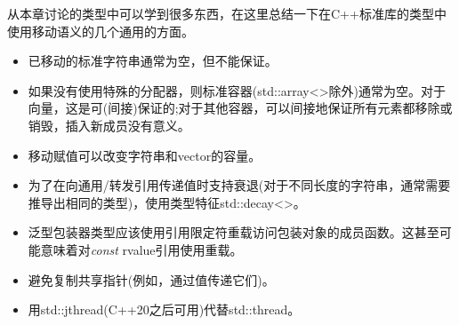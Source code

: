 从本章讨论的类型中可以学到很多东西，在这里总结一下在C++标准库的类型中使用移动语义的几个通用的方面。\par

\begin{itemize}
	\item 已移动的标准字符串通常为空，但不能保证。
	\item 如果没有使用特殊的分配器，则标准容器(std::array<>除外)通常为空。对于向量，这是可(间接)保证的;对于其他容器，可以间接地保证所有元素都移除或销毁，插入新成员没有意义。
	\item 移动赋值可以改变字符串和vector的容量。
	\item 为了在向通用/转发引用传递值时支持衰退(对于不同长度的字符串，通常需要推导出相同的类型)，使用类型特征std::decay<>。
	\item 泛型包装器类型应该使用引用限定符重载访问包装对象的成员函数。这甚至可能意味着对\textit{const} rvalue引用使用重载。
	\item 避免复制共享指针(例如，通过值传递它们)。
	\item 用std::jthread(C++20之后可用)代替std::thread。
\end{itemize}


\newpage